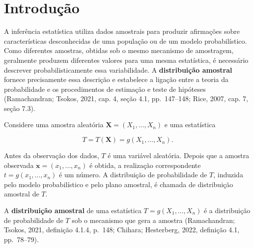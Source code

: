 \documentclass[
  letterpaper,
  DIV=11,
  numbers=noendperiod]{scrreprt}
\begin{document}
\section{Introdução}\label{introduuxe7uxe3o}

A inferência estatística utiliza dados amostrais para produzir
afirmações sobre características desconhecidas de uma população ou de um
modelo probabilístico. Como diferentes amostras, obtidas sob o mesmo
mecanismo de amostragem, geralmente produzem diferentes valores para uma
mesma estatística, é necessário descrever probabilisticamente essa
variabilidade. A \textbf{distribuição amostral} fornece precisamente
essa descrição e estabelece a ligação entre a teoria da probabilidade e
os procedimentos de estimação e teste de hipóteses (Ramachandran;
Tsokos, 2021, cap. 4, seção 4.1, pp.~147--148; Rice, 2007, cap. 7, seção
7.3).

Considere uma amostra aleatória \(\mathbf{X}=(X_1,\ldots,X_n)\) e uma
estatística

\[T=T(\mathbf{X})=g(X_1,\ldots,X_n).\]

Antes da observação dos dados, \(T\) é uma variável aleatória. Depois
que a amostra observada \(\mathbf{x}=(x_1,\ldots,x_n)\) é obtida, a
realização correspondente \(t=g(x_1,\ldots,x_n)\) é um número. A
distribuição de probabilidade de \(T\), induzida pelo modelo
probabilístico e pelo plano amostral, é chamada de distribuição amostral
de \(T\).

\begin{tcolorbox}[enhanced jigsaw, colback=white, leftrule=.75mm, colbacktitle=quarto-callout-important-color!10!white, breakable, titlerule=0mm, bottomtitle=1mm, title=\textcolor{quarto-callout-important-color}{\faExclamation}\hspace{0.5em}{Definição --- Distribuição amostral}, colframe=quarto-callout-important-color-frame, toprule=.15mm, opacityback=0, bottomrule=.15mm, opacitybacktitle=0.6, arc=.35mm, toptitle=1mm, rightrule=.15mm, coltitle=black, left=2mm]

A \textbf{distribuição amostral} de uma estatística
\(T=g(X_1,\ldots,X_n)\) é a distribuição de probabilidade de \(T\) sob o
mecanismo que gera a amostra (Ramachandran; Tsokos, 2021, definição
4.1.4, p.~148; Chihara; Hesterberg, 2022, definição 4.1, pp.~78--79).

\end{tcolorbox}
\end{document}
